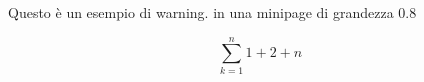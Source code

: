 \documentclass[10pt]{article}
\begin{document}
\begin{center}
	\begin{minipage}{0.8\linewidth} %
	
	\begin{warn}
	Questo è un esempio di warning. in una minipage di grandezza 0.8
	
	\end{warn}
	
	\end{minipage}
\end{center}

\begin{equation}
\sum_{k=1}^{n}1+2+n
\end{equation}

\clearpage
\end{document}
